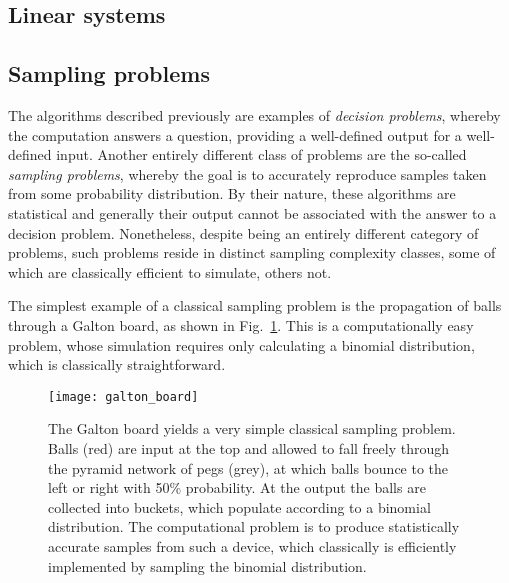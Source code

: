 \subsection{Linear systems} 

\cite{bib:harrow2009quantum}



%
%

\subsection{Sampling problems}

The algorithms described previously are examples of \textit{decision problems}, whereby the computation answers a question, providing a well-defined output for a well-defined input. Another entirely different class of problems are the so-called \textit{sampling problems}, whereby the goal is to accurately reproduce samples taken from some probability distribution. By their nature, these algorithms are statistical and generally their output cannot be associated with the answer to a decision problem. Nonetheless, despite being an entirely different category of problems, such problems reside in distinct sampling complexity classes, some of which are classically efficient to simulate, others not.

The simplest example of a classical sampling problem is the propagation of balls through a Galton board, as shown in Fig.~\ref{fig:galton_board}. This is a computationally easy problem, whose simulation requires only calculating a binomial distribution, which is classically straightforward.

\begin{figure}[!htb]
\texttt{[image: galton\_board]}
\caption{The Galton board yields a very simple classical sampling problem. Balls (red) are input at the top and allowed to fall freely through the pyramid network of pegs (grey), at which balls bounce to the left or right with 50\% probability. At the output the balls are collected into buckets, which populate according to a binomial distribution. The computational problem is to produce statistically accurate samples from such a device, which classically is efficiently implemented by sampling the binomial distribution.}	\label{fig:galton_board}
\end{figure}

